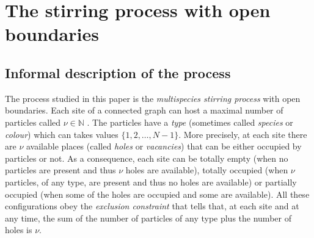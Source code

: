 \documentclass[10pt]{article}
\numberwithin{equation}{section}
\numberwithin{equation}{subsection}
\begin{document}
\section{The stirring process with open boundaries}
\label{sec1}
\subsection{Informal description of the process}
The process studied in this paper is the {\em multispecies stirring process}
with open boundaries. 
Each site
of a connected graph can host a maximal number of particles called $\nu\in \mathbb{N}$ .
The particles have a {\em type} (sometimes called {\em species} or {\em colour})
which can takes  values $\{1,2,\ldots,N-1\}$. {More precisely, at each site there are $\nu$ available places (called \textit{holes} or \textit{vacancies}) that can be either occupied by particles or not. As a consequence, each site can be totally empty (when no particles are present and thus $\nu$ holes are available), totally occupied (when $\nu$ particles, of any type, are present and thus no holes are available) or partially occupied (when some of the holes are occupied and some are available). All these configurations obey the \textit{exclusion constraint} that tells that, at each site and at any time, the sum of the number of particles of any type plus the number of holes is $\nu$.}
\end{document}

